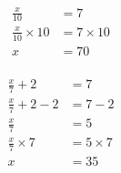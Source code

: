 \documentclass[12pt]{article}
\newcounter{minipagecount}
\begin{document}
\begin{multicols}{2}
\begin{minipage}[t]{0.45\textwidth}
\begin{align*}
        \frac{x}{10} &= 7\\
        \frac{x}{10} \times10 &= 7 \times10\\
        x &= 70\\
    \end{align*}
\end{minipage} %
\noindent{(\theminipagecount)}\hspace{0.1mm} %
\begin{minipage}[t]{0.45\textwidth} %
    \vspace{-26pt}  %
    \raggedright %
    \begin{align*} %
        \frac{x}{7} + 2 &= 7\\
        \frac{x}{7} + 2 - 2 &= 7 - 2\\
        \frac{x}{7} &= 5\\
        \frac{x}{7} \times7 &= 5 \times7\\
        x &= 35\\
    \end{align*}
\end{minipage} %
\noindent{(\theminipagecount)}\hspace{0.1mm} %
\begin{minipage}[t]{0.45\textwidth} %
    \vspace{-26pt}  %
    \raggedright %
    \begin{align*} %

\end{align*}
\end{minipage}
\end{multicols}
\end{document}
